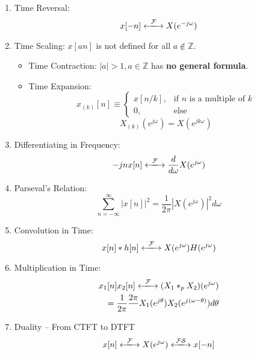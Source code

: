 \documentclass[a4paper,12pt]{report}
\def\fft{\xlongleftrightarrow{\mathcal{F}}}
\def\fs{\xlongleftrightarrow{\mathcal{FS}}}
\begin{document}
\begin{enumerate}
\item Time Reversal:
\begin{equation}
x[-n] \fft X(e^{-j\omega} )
\end{equation}

\item Time Scaling: $x[an]$ is not defined for all $a\notin \mathbb{Z}$. 
\begin{itemize}
\item Time Contraction: $|a| > 1, a\in \mathbb{Z}$ has \textbf{no general formula}.
\item Time Expansion: 
\begin{equation}
x_{(k)}[n] \equiv \begin{cases}
x[n/k], & \text{if }n\text{ is a multiple of } k \\
0, & \text{else}
\end{cases}
\end{equation}
\begin{equation}
X_{(k)}(e^{j\omega}) = X(e^{jk\omega})
\end{equation}
\end{itemize}


\item Differentiating in Frequency: 
\begin{equation}
-jn x[n] \fft \frac{d}{d\omega} X(e^{j\omega})
\end{equation}


\item Parseval's Relation: 
\begin{equation}
\sum_{n=-\infty}^{\infty} |x[n]|^2 = \frac{1}{2\pi} |X(e^{j\omega})|^2 d\omega
\end{equation}


\item Convolution in Time: 
\begin{equation}
x[n] * h[n] \fft X(e^{j\omega})H(e^{j\omega})
\end{equation}


\item Multiplication in Time: 
\begin{align}
x_1[n]x_2[n] \fft (X_1 *_p X_2)(e^{j\omega}) \\
= \frac{1}{2\pi} \frac{2\pi}{} X_1(e^{j\theta})X_2(e^{j(\omega - \theta)}) d\theta
\end{align}


\item Duality -- From CTFT to DTFT
\begin{equation}
x[n] \fft X(e^{j\omega}) \fs x[-n]
\end{equation}
\end{enumerate}
\end{document}
